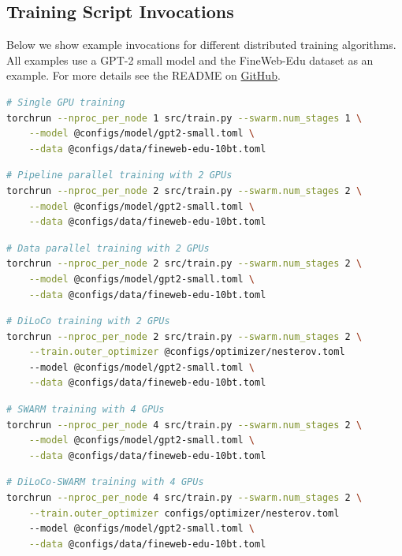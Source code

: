 \documentclass{article}
\newcommand{\github}{\href{https://github.com/mikasenghaas/diloco-swarm}{GitHub}}
\begin{document}

\subsection{Training Script Invocations}

Below we show example invocations for different distributed training algorithms.
All examples use a GPT-2 small model and the FineWeb-Edu dataset as an example.
For more details see the README on \github.

\begin{lstlisting}[language=bash]
# Single GPU training
torchrun --nproc_per_node 1 src/train.py --swarm.num_stages 1 \
    --model @configs/model/gpt2-small.toml \
    --data @configs/data/fineweb-edu-10bt.toml
\end{lstlisting}

\begin{lstlisting}[language=bash]
# Pipeline parallel training with 2 GPUs
torchrun --nproc_per_node 2 src/train.py --swarm.num_stages 2 \
    --model @configs/model/gpt2-small.toml \
    --data @configs/data/fineweb-edu-10bt.toml
\end{lstlisting}

\begin{lstlisting}[language=bash]
# Data parallel training with 2 GPUs
torchrun --nproc_per_node 2 src/train.py --swarm.num_stages 2 \
    --model @configs/model/gpt2-small.toml \
    --data @configs/data/fineweb-edu-10bt.toml
\end{lstlisting}

\begin{lstlisting}[language=bash]
# DiLoCo training with 2 GPUs
torchrun --nproc_per_node 2 src/train.py --swarm.num_stages 2 \
    --train.outer_optimizer @configs/optimizer/nesterov.toml
    --model @configs/model/gpt2-small.toml \
    --data @configs/data/fineweb-edu-10bt.toml
\end{lstlisting}

\begin{lstlisting}[language=bash]
# SWARM training with 4 GPUs
torchrun --nproc_per_node 4 src/train.py --swarm.num_stages 2 \
    --model @configs/model/gpt2-small.toml \
    --data @configs/data/fineweb-edu-10bt.toml
\end{lstlisting}

\begin{lstlisting}[language=bash]
# DiLoCo-SWARM training with 4 GPUs
torchrun --nproc_per_node 4 src/train.py --swarm.num_stages 2 \
    --train.outer_optimizer configs/optimizer/nesterov.toml
    --model @configs/model/gpt2-small.toml \
    --data @configs/data/fineweb-edu-10bt.toml
\end{lstlisting}
\end{document}
